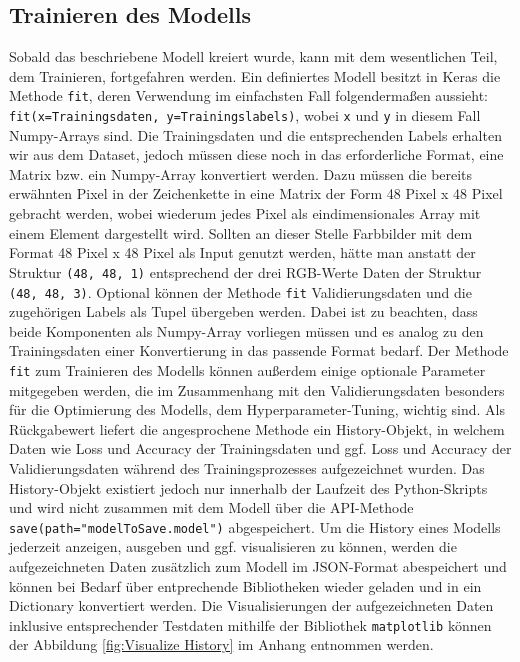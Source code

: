 \documentclass[12pt, a4paper]{report}
\begin{document}
\subsection{Trainieren des Modells}
Sobald das beschriebene Modell kreiert wurde, kann mit dem wesentlichen Teil, dem Trainieren, fortgefahren werden. Ein definiertes Modell besitzt in Keras die Methode \texttt{fit}, deren Verwendung im einfachsten Fall folgendermaßen aussieht: \texttt{fit(x=Trainingsdaten, y=Trainingslabels)}, wobei \texttt{x} und \texttt{y} in diesem Fall Numpy-Arrays sind. Die Trainingsdaten und die entsprechenden Labels erhalten wir aus dem Dataset, jedoch müssen diese noch in das erforderliche Format, eine Matrix bzw. ein Numpy-Array konvertiert werden. Dazu müssen die bereits erwähnten Pixel in der Zeichenkette in eine Matrix der Form 48 Pixel x 48 Pixel gebracht werden, wobei wiederum jedes Pixel als eindimensionales Array mit einem Element dargestellt wird. Sollten an dieser Stelle Farbbilder mit dem Format 48 Pixel x 48 Pixel als Input genutzt werden, hätte man anstatt der Struktur \texttt{(48, 48, 1)} entsprechend der drei RGB-Werte Daten der Struktur \texttt{(48, 48, 3)}. Optional können der Methode \texttt{fit} Validierungsdaten und die zugehörigen Labels als Tupel übergeben werden. Dabei ist zu beachten, dass beide Komponenten als Numpy-Array vorliegen müssen und es analog zu den Trainingsdaten einer Konvertierung in das passende Format bedarf. Der Methode \texttt{fit} zum Trainieren des Modells können außerdem einige optionale Parameter mitgegeben werden, die im Zusammenhang mit den Validierungsdaten besonders für die Optimierung des Modells, dem Hyperparameter-Tuning, wichtig sind.\newline
Als Rückgabewert liefert die angesprochene Methode ein History-Objekt, in welchem Daten wie Loss und Accuracy der Trainingsdaten und ggf. Loss und Accuracy der Validierungsdaten während des Trainingsprozesses aufgezeichnet wurden. Das History-Objekt existiert jedoch nur innerhalb der Laufzeit des Python-Skripts und wird nicht zusammen mit dem Modell über die API-Methode \texttt{save(path="modelToSave.model")} abgespeichert. Um die History eines Modells jederzeit anzeigen, ausgeben und ggf. visualisieren zu können, werden die aufgezeichneten Daten zusätzlich zum Modell im JSON-Format abespeichert und können bei Bedarf über entprechende Bibliotheken wieder geladen und in ein Dictionary konvertiert werden.\newline
Die Visualisierungen der aufgezeichneten Daten inklusive entsprechender Testdaten mithilfe der Bibliothek \texttt{matplotlib} können der Abbildung \ref{fig:Visualize History} im Anhang entnommen werden.
\end{document}
